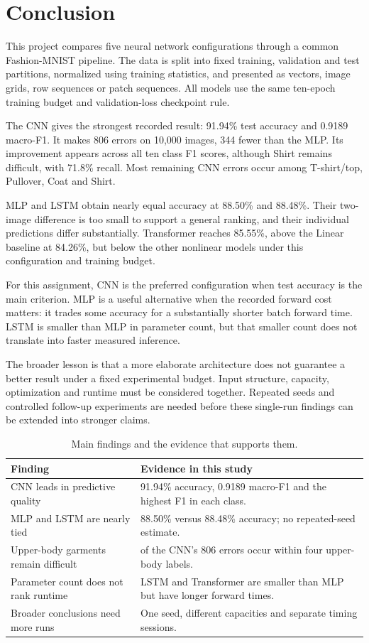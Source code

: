 \section{Conclusion}
This project compares five neural network configurations through a common
Fashion-MNIST pipeline. The data is split into fixed training, validation and
test partitions, normalized using training statistics, and presented as
vectors, image grids, row sequences or patch sequences. All models use the
same ten-epoch training budget and validation-loss checkpoint rule.

The CNN gives the strongest recorded result: 91.94\% test accuracy and
0.9189 macro-F1. It makes 806 errors on 10,000 images, 344 fewer than the MLP.
Its improvement appears across all ten class F1 scores, although Shirt remains
difficult, with 71.8\% recall. Most remaining CNN errors occur among
T-shirt/top, Pullover, Coat and Shirt.

MLP and LSTM obtain nearly equal accuracy at 88.50\% and 88.48\%. Their
two-image difference is too small to support a general ranking, and their
individual predictions differ substantially. Transformer reaches 85.55\%,
above the Linear baseline at 84.26\%, but below the other nonlinear models
under this configuration and training budget.

For this assignment, CNN is the preferred configuration when test accuracy
is the main criterion. MLP is a useful alternative when the recorded forward
cost matters: it trades some accuracy for a substantially shorter batch
forward time. LSTM is smaller than MLP in parameter count, but that smaller
count does not translate into faster measured inference.

The broader lesson is that a more elaborate architecture does not guarantee
a better result under a fixed experimental budget. Input structure, capacity,
optimization and runtime must be considered together. Repeated seeds and
controlled follow-up experiments are needed before these single-run findings
can be extended into stronger claims.

\vspace{8pt}
\begin{table}[H]\centering
\caption{Main findings and the evidence that supports them.}
\begin{tabularx}{\linewidth}{lX}\toprule
Finding & Evidence in this study\\\midrule
CNN leads in predictive quality &
91.94\% accuracy, 0.9189 macro-F1 and the highest F1 in each class.\\
MLP and LSTM are nearly tied &
88.50\% versus 88.48\% accuracy; no repeated-seed estimate.\\
Upper-body garments remain difficult &
\UpperErrors{} of the CNN's 806 errors occur within four upper-body labels.\\
Parameter count does not rank runtime &
LSTM and Transformer are smaller than MLP but have longer forward times.\\
Broader conclusions need more runs &
One seed, different capacities and separate timing sessions.\\\bottomrule
\end{tabularx}
\end{table}
